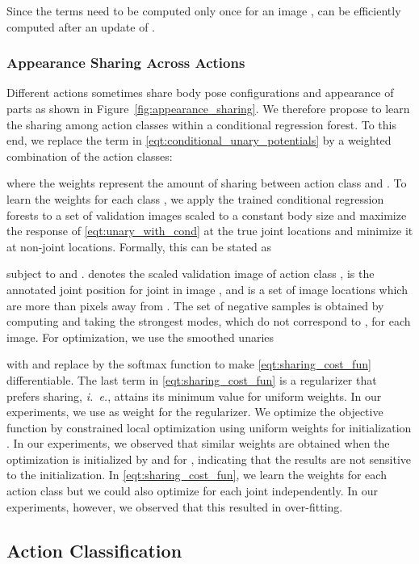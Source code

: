 \documentclass[a4paper, 10pt, conference]{ieeeconf}      \usepackage{FG2017}
\newcommand{\ie}{\mbox{\emph{i. e.}}}
\begin{document}
Since the terms  need to be computed only once for an image ,  can be efficiently computed after an update of .  

\subsubsection{Appearance Sharing Across Actions}\label{sec:sharing}
\label{sec:appearance_sharing}

Different actions sometimes share body pose configurations and appearance of parts as shown in Figure~\ref{fig:appearance_sharing}. We therefore propose to learn the sharing among action classes within a conditional regression forest. To this end, we replace the term  in \eqref{eqt:conditional_unary_potentials} by a weighted combination of the action classes:

 
where the weights  represent the amount of sharing between action class  and . To learn the weights  for each class , we apply the trained conditional regression forests to a set of validation images scaled to a constant body size and maximize the response of \eqref{eqt:unary_with_cond} at the true joint locations and minimize it at non-joint locations. Formally, this can be stated as

subject to  and .  denotes the  scaled validation image of action class ,  is the annotated joint position for joint  in image , and  is a set of image locations which are more than  pixels away from . 
The set of negative samples is obtained by computing  and taking the  strongest modes, which do not correspond to , for each image. For optimization, we use the smoothed unaries

with  and replace  by the softmax function to make \eqref{eqt:sharing_cost_fun} differentiable. The last term in \eqref{eqt:sharing_cost_fun} is a regularizer that prefers sharing, \ie,  attains its minimum value for uniform weights. In our experiments, we use  as weight for the regularizer.    
We optimize the objective function by constrained local optimization using uniform weights for initialization . In our experiments, we observed that similar weights are obtained when the optimization is initialized by  and  for , indicating that the results are not sensitive to the initialization.   
In \eqref{eqt:sharing_cost_fun}, we learn the weights  for each action class but we could also optimize for each joint independently. In our experiments, however, we observed that this resulted in over-fitting. 

\subsection{Action Classification}
\label{sec:action_recognition}
\end{document}
